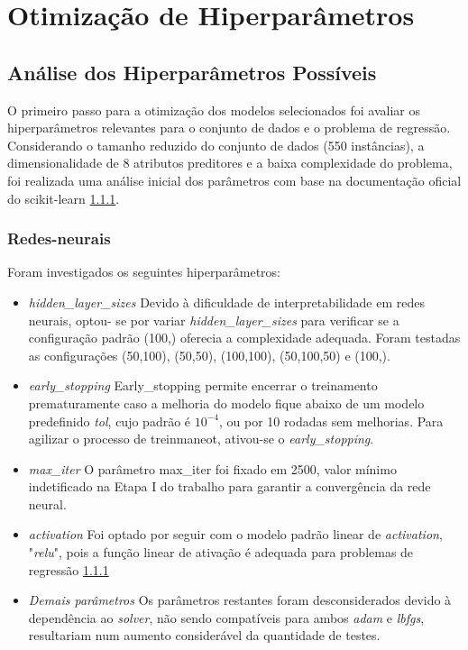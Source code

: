 \documentclass{report}
\let\oldsection\section
\renewcommand\section{\clearpage\oldsection}
\begin{document}
\section{Otimização de Hiperparâmetros} \label{sec: 5.1}

\subsection{Análise dos Hiperparâmetros Possíveis}

O primeiro passo para a otimização dos modelos selecionados foi avaliar os hiperparâmetros relevantes para o conjunto de dados e o problema de regressão. Considerando o tamanho reduzido do conjunto de dados (550 instâncias), a dimensionalidade de 8 atributos preditores e a baixa complexidade do problema, foi realizada uma análise inicial dos parâmetros com base na documentação oficial do scikit-learn \ref{}.

\subsubsection{Redes-neurais}
Foram investigados os seguintes hiperparâmetros:
\begin{itemize}
    \item \textit{hidden\_layer\_sizes}
    Devido à dificuldade de interpretabilidade em redes neurais, optou-
    se por variar \textit{hidden\_layer\_sizes} para verificar se a configuração padrão (100,) oferecia a complexidade adequada. Foram testadas as configurações (50,100), (50,50), (100,100), (50,100,50) e (100,).
    \item \textit{early\_stopping}
    Early\_stopping permite encerrar o treinamento prematuramente caso a melhoria do modelo fique abaixo de um modelo predefinido \textit{tol}, cujo padrão é ${10^{-4}}$, ou por 10 rodadas sem melhorias. Para agilizar o processo de treinmaneot, ativou-se o \textit{early\_stopping}.
    \item \textit{max\_iter}
    O parâmetro max\_iter foi fixado em 2500, valor mínimo indetificado na Etapa I do trabalho para garantir a convergência da rede neural.
    \item \textit{activation}
    Foi optado por seguir com o modelo padrão linear de \textit{activation}, "\textit{relu}", pois a função linear de ativação é adequada para problemas de regressão \ref{} %
    \item \textit{Demais parâmetros}
    Os parâmetros restantes foram desconsiderados devido à dependência ao \textit{solver}, não sendo compatíveis para ambos \textit{adam} e \textit{lbfgs}, resultariam num aumento considerável da quantidade de testes.
\end{itemize}
\end{document}
